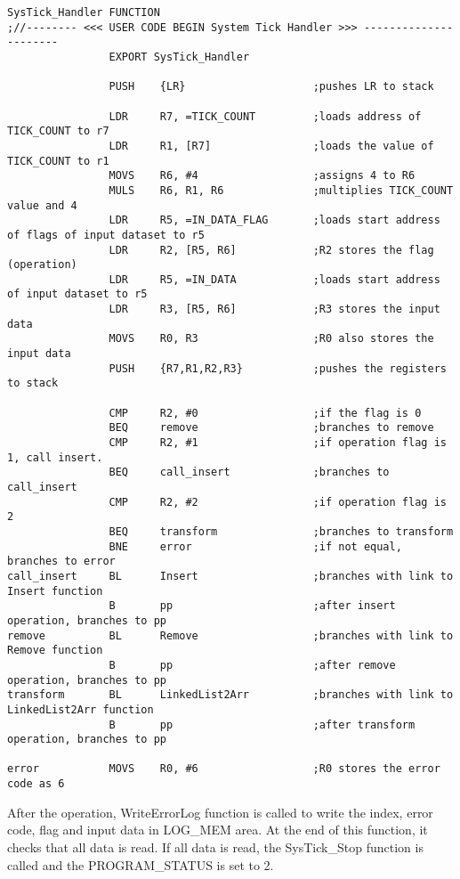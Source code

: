 \documentclass[pdftex,12pt,a4paper]{article}
\begin{document}
\begin{lstlisting}[caption=SysTick\_Handler Function, style=customasm]
SysTick_Handler	FUNCTION			
;//-------- <<< USER CODE BEGIN System Tick Handler >>> ----------------------																	
				EXPORT SysTick_Handler
					
				PUSH	{LR}					;pushes LR to stack
				
				LDR 	R7, =TICK_COUNT			;loads address of TICK_COUNT to r7
				LDR		R1, [R7]				;loads the value of TICK_COUNT to r1
				MOVS	R6, #4					;assigns 4 to R6
				MULS	R6, R1, R6				;multiplies TICK_COUNT value and 4
				LDR		R5, =IN_DATA_FLAG		;loads start address of flags of input dataset to r5
				LDR		R2, [R5, R6]			;R2 stores the flag (operation)
				LDR		R5, =IN_DATA			;loads start address of input dataset to r5
				LDR		R3, [R5, R6]			;R3 stores the input data
				MOVS	R0, R3					;R0 also stores the input data
				PUSH	{R7,R1,R2,R3}			;pushes the registers to stack 
				
				CMP		R2, #0					;if the flag is 0
				BEQ		remove					;branches to remove
				CMP		R2, #1					;if operation flag is 1, call insert.
				BEQ		call_insert				;branches to call_insert
				CMP		R2, #2					;if operation flag is 2
				BEQ		transform				;branches to transform
				BNE		error					;if not equal, branches to error
call_insert		BL		Insert					;branches with link to Insert function
				B		pp						;after insert operation, branches to pp
remove			BL		Remove					;branches with link to Remove function
				B		pp						;after remove operation, branches to pp
transform		BL		LinkedList2Arr			;branches with link to LinkedList2Arr function
				B		pp						;after transform operation, branches to pp
				
error			MOVS	R0, #6					;R0 stores the error code as 6
\end{lstlisting}

After the operation, WriteErrorLog function is called to write the index, error code, flag and input data in LOG\_MEM area. At the end of this function, it checks that all data is read. If all data is read, the SysTick\_Stop function is called and the PROGRAM\_STATUS is set to 2.
\end{document}
